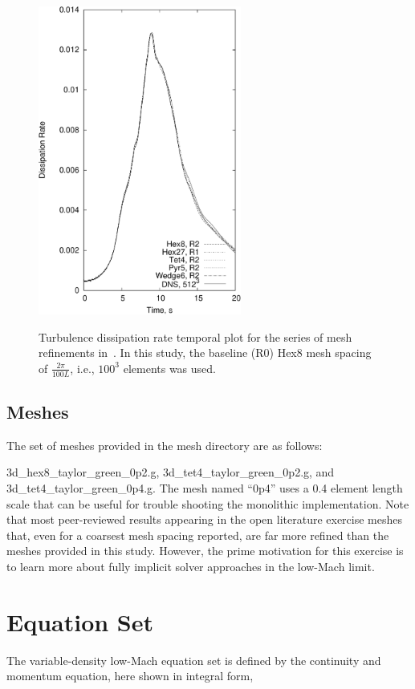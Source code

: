 \documentclass{article}
\begin{document}
\begin{figure}[!htbp]
  \centering
  {
   \includegraphics[height=4.0in]{images/tg_diss_hex8_tet4_pyr5_wedge6_R2_CU-crop.pdf}
  }
  \caption{Turbulence dissipation rate temporal plot for the series of mesh refinements in~\cite{domino2019}. In this
study, the baseline (R0) Hex8 mesh spacing of $\frac{2\pi}{100 L}$, i.e., $100^3$ elements was used.}
  \label{fig:ek}
\end{figure}

\subsection{Meshes}
The set of meshes provided in the mesh directory are as follows:

3d\_hex8\_taylor\_green\_0p2.g, 3d\_tet4\_taylor\_green\_0p2.g, and 3d\_tet4\_taylor\_green\_0p4.g. The 
mesh named ``0p4'' uses a 0.4 element length scale that can be useful for trouble shooting the monolithic 
implementation. Note that most peer-reviewed results appearing in the open literature exercise meshes 
that, even for a coarsest mesh spacing reported, are far more refined than the meshes provided in this study. 
However, the prime motivation for this exercise is to learn more about fully implicit solver approaches
in the low-Mach limit.

\section{Equation Set}
The variable-density low-Mach equation set is defined by the continuity and momentum equation, here shown in
integral form,
\end{document}
